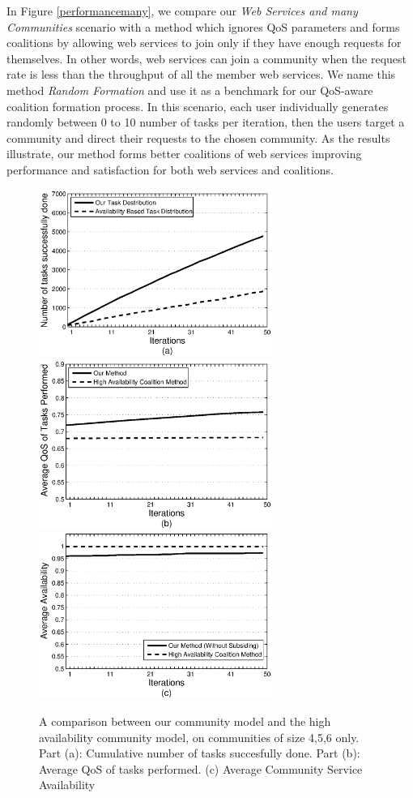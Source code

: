 \documentclass[10pt,journal,cspaper,compsoc]{IEEEtran}
\begin{document}
In Figure \ref{performancemany}, we compare our \emph{Web Services
and many Communities} scenario with a method which ignores QoS
parameters and forms coalitions by allowing web services to join
only if they have enough requests for themselves. In other words,
web services can join a community when the request rate is less
than the throughput of all the member web services. We name this
method \emph{Random Formation} and use it as a benchmark for our
QoS-aware coalition formation process. In this scenario, each user individually generates randomly
between 0 to 10 number of tasks per iteration, then the users target a community and direct their requests to the chosen community. As the results illustrate,
our method forms better coalitions of web services improving
performance and satisfaction for both web services and coalitions.

\begin{figure}[!t]
\centering
\includegraphics[width=3in]{avg_task_ws_done.eps}
\includegraphics[width=3in]{avg_qos_ws_done.eps}
\includegraphics[width=3in]{avg_avail_ws_done.eps}
\caption{A comparison between our community model and the high availability community model, on communities of size 4,5,6 only. Part (a): Cumulative number of tasks succesfully done. Part
(b): Average QoS of tasks performed. (c) Average Community Service Availability} \label{fig_avail_method}
\end{figure}
\end{document}
